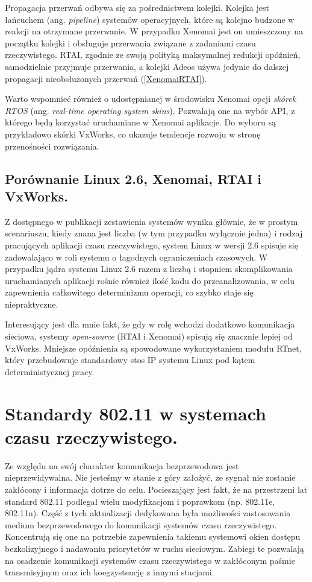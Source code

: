 Propagacja przerwań odbywa się za pośrednictwem kolejki. Kolejka jest łańcuchem (ang. \emph{pipeline}) systemów operacyjnych, które są kolejno budzone w reakcji na otrzymane przerwanie. W przypadku Xenomai jest on umieszczony na początku kolejki i obsługuje przerwania związane z zadaniami czasu rzeczywistego. RTAI, zgodnie ze swoją polityką maksymalnej redukcji opóźnień, samodzielnie przyjmuje przerwania, a kolejki Adeos używa jedynie do dalszej propagacji nieobsłużonych przerwań (\ref{XenomaiRTAI}). 

Warto wspomnieć również o udostępnianej w środowisku Xenomai opcji \emph{skórek RTOS} (ang. \emph{real-time operating system skins}). Pozwalają one na wybór API, z którego będą korzystać uruchamiane w Xenomai aplikacje. Do wyboru są przykładowo skórki VxWorks, co ukazuje tendencje rozwoju w stronę przenośności rozwiązania.

\subsection{Porównanie Linux 2.6, Xenomai, RTAI i VxWorks.}

Z dostępnego w publikacji \cite{pub:Comparison} zestawienia systemów wynika głównie, że w prostym scenariuszu, kiedy znana jest liczba (w tym przypadku wyłącznie jedna) i rodzaj pracujących aplikacji czasu rzeczywistego, system Linux w wersji 2.6 spisuje się zadowalająco w roli systemu o łagodnych ograniczeniach czasowych. W przypadku jądra systemu Linux 2.6 razem z liczbą i stopniem skomplikowania uruchamianych aplikacji rośnie również ilość kodu do przeanalizowania, w celu zapewnienia całkowitego determinizmu operacji, co szybko staje się niepraktyczne.

Interesujący jest dla mnie fakt, że gdy w rolę wchodzi dodatkowo komunikacja sieciowa, systemy \emph{open-source} (RTAI i Xenomai) spisują się znacznie lepiej od VxWorks. Mniejsze opóźnienia są spowodowane wykorzystaniem modułu RTnet, który przebudowuje standardowy stos IP systemu Linux pod kątem deterministycznej pracy.


\section{Standardy 802.11 w systemach czasu rzeczywistego.}

Ze względu na swój charakter komunikacja bezprzewodowa jest nieprzewidywalna. Nie jesteśmy w stanie z góry założyć, ze sygnał nie zostanie zakłócony i informacja dotrze do celu. Pocieszający jest fakt, że na przestrzeni lat standard 802.11 podlegał wielu modyfikacjom i poprawkom (np. 802.11e, 802.11n). Część z tych aktualizacji dedykowana była możliwości zastosowania medium bezprzewodowego do komunikacji systemów czasu rzeczywistego. Koncentrują się one na potrzebie zapewnienia takiemu systemowi okien dostępu bezkolizyjnego i nadawaniu priorytetów w ruchu sieciowym. Zabiegi te pozwalają na osadzenie komunikacji systemów czasu rzeczywistego w zakłóconym paśmie transmisyjnym oraz ich koegzystencję z innymi stacjami. 

